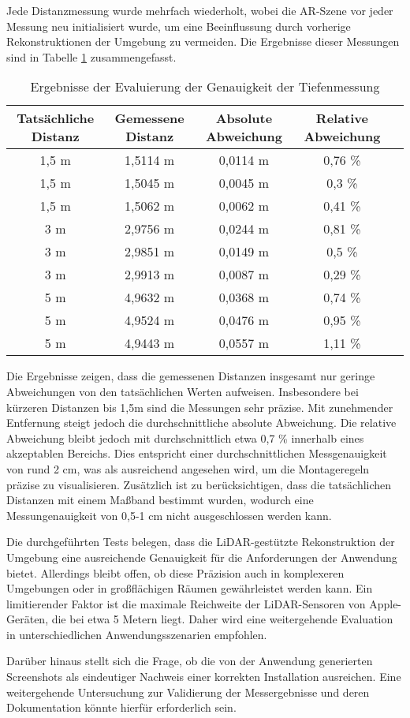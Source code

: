 Jede Distanzmessung wurde mehrfach wiederholt, wobei die AR-Szene vor jeder Messung neu initialisiert wurde, um eine Beeinflussung durch vorherige Rekonstruktionen der Umgebung zu vermeiden. Die Ergebnisse dieser Messungen sind in Tabelle \ref{tab:DistanceMeasurement} zusammengefasst.

\begin{table}[ht]
    \centering
    \begin{tabular}{ccccl}
        \hline
        Tatsächliche Distanz & Gemessene Distanz & Absolute Abweichung & Relative Abweichung \\
        \hline
        1,5 m & 1,5114 m & 0,0114 m & 0,76 \% \\
        1,5 m & 1,5045 m & 0,0045 m & 0,3 \% \\
        1,5 m & 1,5062 m & 0,0062 m & 0,41 \% \\
        \hline
        3 m & 2,9756 m & 0,0244 m & 0,81 \% \\
        3 m & 2,9851 m & 0,0149 m & 0,5 \% \\
        3 m & 2,9913 m & 0,0087 m & 0,29 \% \\
        \hline
        5 m & 4,9632 m & 0,0368 m & 0,74 \% \\
        5 m & 4,9524 m & 0,0476 m & 0,95 \% \\
        5 m & 4,9443 m & 0,0557 m & 1,11 \% \\
        \hline
    \end{tabular}
    \caption{Ergebnisse der Evaluierung der Genauigkeit der Tiefenmessung}
    \label{tab:DistanceMeasurement}
\end{table}

Die Ergebnisse zeigen, dass die gemessenen Distanzen insgesamt nur geringe Abweichungen von den tatsächlichen Werten aufweisen. Insbesondere bei kürzeren Distanzen bis 1,5m sind die Messungen sehr präzise. Mit zunehmender Entfernung steigt jedoch die durchschnittliche absolute Abweichung. Die relative Abweichung bleibt jedoch mit durchschnittlich etwa 0,7 \% innerhalb eines akzeptablen Bereichs. Dies entspricht einer durchschnittlichen Messgenauigkeit von rund 2 cm, was als ausreichend angesehen wird, um die Montageregeln präzise zu visualisieren. Zusätzlich ist zu berücksichtigen, dass die tatsächlichen Distanzen mit einem Maßband bestimmt wurden, wodurch eine Messungenauigkeit von 0,5-1 cm nicht ausgeschlossen werden kann.

Die durchgeführten Tests belegen, dass die LiDAR-gestützte Rekonstruktion der Umgebung eine ausreichende Genauigkeit für die Anforderungen der Anwendung bietet. Allerdings bleibt offen, ob diese Präzision auch in komplexeren Umgebungen oder in großflächigen Räumen gewährleistet werden kann. Ein limitierender Faktor ist die maximale Reichweite der LiDAR-Sensoren von Apple-Geräten, die bei etwa 5 Metern liegt. Daher wird eine weitergehende Evaluation in unterschiedlichen Anwendungsszenarien empfohlen. \cite{appledevdoc}

Darüber hinaus stellt sich die Frage, ob die von der Anwendung generierten Screenshots als eindeutiger Nachweis einer korrekten Installation ausreichen. Eine weitergehende Untersuchung zur Validierung der Messergebnisse und deren Dokumentation könnte hierfür erforderlich sein. 